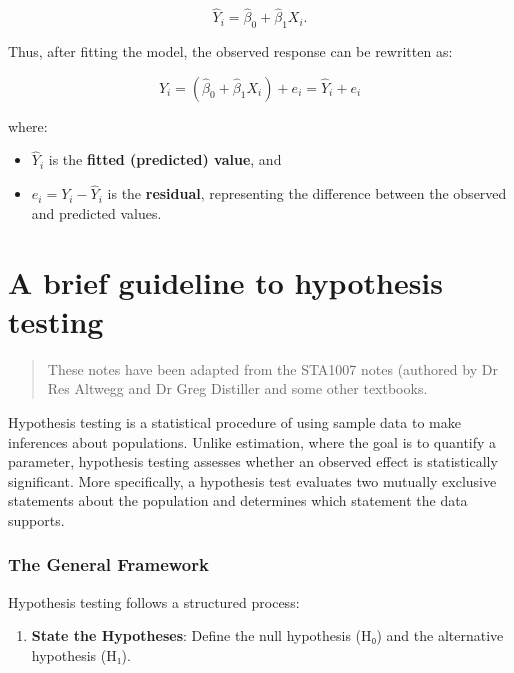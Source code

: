 \documentclass[
  letterpaper,
]{book}
\providecommand{\tightlist}{%
  \setlength{\itemsep}{0pt}\setlength{\parskip}{0pt}}\usepackage{longtable,booktabs,array}
\begin{document}
\[
\hat{Y}_i = \hat{\beta}_0 + \hat{\beta}_1 X_i.
\]

Thus, after fitting the model, the observed response can be rewritten
as:

\[
Y_i = (\hat{\beta}_0 + \hat{\beta}_1 X_i) + e_i = \hat{Y}_i + e_i
\]

where:

\begin{itemize}
\tightlist
\item
  \(\hat{Y}_i\) is the \textbf{fitted (predicted) value}, and
\item
  \(e_i = Y_i - \hat{Y}_i\) is the \textbf{residual}, representing the
  difference between the observed and predicted values.
\end{itemize}


\chapter*{A brief guideline to hypothesis
testing}\label{a-brief-guideline-to-hypothesis-testing}


\begin{quote}
These notes have been adapted from the STA1007 notes (authored by Dr Res
Altwegg and Dr Greg Distiller and some other textbooks.
\end{quote}

Hypothesis testing is a statistical procedure of using sample data to
make inferences about populations. Unlike estimation, where the goal is
to quantify a parameter, hypothesis testing assesses whether an observed
effect is statistically significant. More specifically, a hypothesis
test evaluates two mutually exclusive statements about the population
and determines which statement the data supports.

\subsection*{The General Framework}\label{the-general-framework}

Hypothesis testing follows a structured process:

\begin{enumerate}
\def\labelenumi{\arabic{enumi}.}
\tightlist
\item
  \textbf{State the Hypotheses}: Define the null hypothesis (H₀) and the
  alternative hypothesis (H₁).
\end{enumerate}
\end{document}
